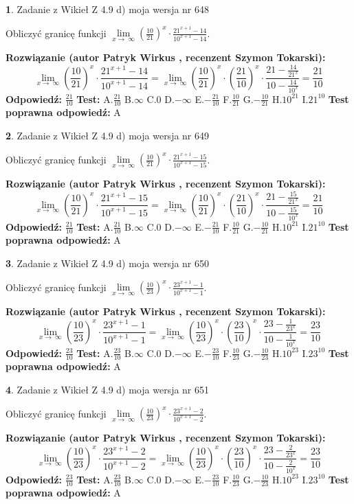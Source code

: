 \documentclass[12pt, a4paper]{article}
\theoremstyle{definition} %
\newtheorem{zad}{}
\newcommand{\zadStart}[1]{\begin{zad}#1\newline}
\newcommand{\zadStop}{\end{zad}}
\newcommand{\rozwStart}[2]{\noindent \textbf{Rozwiązanie (autor #1 , recenzent #2): }\newline}
\newcommand{\rozwStop}{\newline}
\newcommand{\odpStart}{\noindent \textbf{Odpowiedź:}\newline}
\newcommand{\odpStop}{\newline}
\newcommand{\testStart}{\noindent \textbf{Test:}\newline}
\newcommand{\testStop}{\newline}
\newcommand{\kluczStart}{\noindent \textbf{Test poprawna odpowiedź:}\newline}
\newcommand{\kluczStop}{\newline}
\begin{document}
\zadStart{Zadanie z Wikieł Z 4.9 d) moja wersja nr 648}


Obliczyć granicę funkcji  $\lim\limits_{x\to\ \infty}(\frac{10}{21})^{x}\cdot\frac{21^{x+1}-14}{10^{x+1}-14}$.
\zadStop
\rozwStart{Patryk Wirkus}{Szymon Tokarski}
$$\lim\limits_{x\to\ \infty}(\frac{10}{21})^{x}\cdot\frac{21^{x+1}-14}{10^{x+1}-14}=\lim\limits_{x\to\ \infty}(\frac{10}{21})^{x}\cdot(\frac{21}{10})^{x} \cdot \frac{21-\frac{14}{21^{x}}}{10-\frac{14}{10^{x}}} = \frac{21}{10}$$
\rozwStop
\odpStart
$\frac{21}{10}$
\odpStop
\testStart
A.$\frac{21}{10}$ B.$\infty$ C.$0$ D.$-\infty$ E.$-\frac{21}{10}$
F.$\frac{10}{21}$ G.$-\frac{10}{21}$
H.$10^{21}$
I.$21^{10}$
\testStop
\kluczStart
A
\kluczStop



\zadStart{Zadanie z Wikieł Z 4.9 d) moja wersja nr 649}


Obliczyć granicę funkcji  $\lim\limits_{x\to\ \infty}(\frac{10}{21})^{x}\cdot\frac{21^{x+1}-15}{10^{x+1}-15}$.
\zadStop
\rozwStart{Patryk Wirkus}{Szymon Tokarski}
$$\lim\limits_{x\to\ \infty}(\frac{10}{21})^{x}\cdot\frac{21^{x+1}-15}{10^{x+1}-15}=\lim\limits_{x\to\ \infty}(\frac{10}{21})^{x}\cdot(\frac{21}{10})^{x} \cdot \frac{21-\frac{15}{21^{x}}}{10-\frac{15}{10^{x}}} = \frac{21}{10}$$
\rozwStop
\odpStart
$\frac{21}{10}$
\odpStop
\testStart
A.$\frac{21}{10}$ B.$\infty$ C.$0$ D.$-\infty$ E.$-\frac{21}{10}$
F.$\frac{10}{21}$ G.$-\frac{10}{21}$
H.$10^{21}$
I.$21^{10}$
\testStop
\kluczStart
A
\kluczStop



\zadStart{Zadanie z Wikieł Z 4.9 d) moja wersja nr 650}


Obliczyć granicę funkcji  $\lim\limits_{x\to\ \infty}(\frac{10}{23})^{x}\cdot\frac{23^{x+1}-1}{10^{x+1}-1}$.
\zadStop
\rozwStart{Patryk Wirkus}{Szymon Tokarski}
$$\lim\limits_{x\to\ \infty}(\frac{10}{23})^{x}\cdot\frac{23^{x+1}-1}{10^{x+1}-1}=\lim\limits_{x\to\ \infty}(\frac{10}{23})^{x}\cdot(\frac{23}{10})^{x} \cdot \frac{23-\frac{1}{23^{x}}}{10-\frac{1}{10^{x}}} = \frac{23}{10}$$
\rozwStop
\odpStart
$\frac{23}{10}$
\odpStop
\testStart
A.$\frac{23}{10}$ B.$\infty$ C.$0$ D.$-\infty$ E.$-\frac{23}{10}$
F.$\frac{10}{23}$ G.$-\frac{10}{23}$
H.$10^{23}$
I.$23^{10}$
\testStop
\kluczStart
A
\kluczStop



\zadStart{Zadanie z Wikieł Z 4.9 d) moja wersja nr 651}


Obliczyć granicę funkcji  $\lim\limits_{x\to\ \infty}(\frac{10}{23})^{x}\cdot\frac{23^{x+1}-2}{10^{x+1}-2}$.
\zadStop
\rozwStart{Patryk Wirkus}{Szymon Tokarski}
$$\lim\limits_{x\to\ \infty}(\frac{10}{23})^{x}\cdot\frac{23^{x+1}-2}{10^{x+1}-2}=\lim\limits_{x\to\ \infty}(\frac{10}{23})^{x}\cdot(\frac{23}{10})^{x} \cdot \frac{23-\frac{2}{23^{x}}}{10-\frac{2}{10^{x}}} = \frac{23}{10}$$
\rozwStop
\odpStart
$\frac{23}{10}$
\odpStop
\testStart
A.$\frac{23}{10}$ B.$\infty$ C.$0$ D.$-\infty$ E.$-\frac{23}{10}$
F.$\frac{10}{23}$ G.$-\frac{10}{23}$
H.$10^{23}$
I.$23^{10}$
\testStop
\kluczStart
A
\kluczStop
\end{document}
